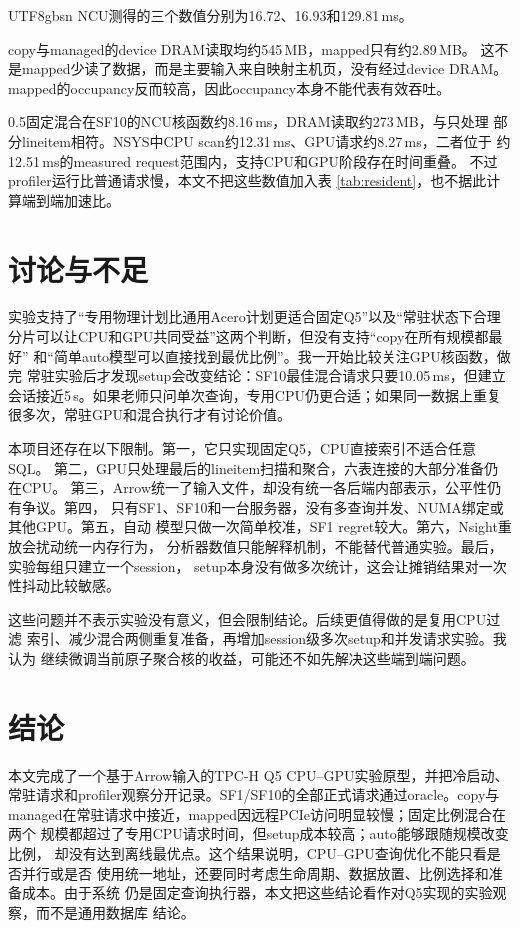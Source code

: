 \documentclass[10.5pt,compsoc]{CjC}
\begin{document}
\begin{CJK*}{UTF8}{gbsn}
NCU测得的三个数值分别为16.72、16.93和129.81\,ms。

copy与managed的device DRAM读取均约545\,MB，mapped只有约2.89\,MB。
这不是mapped少读了数据，而是主要输入来自映射主机页，没有经过device DRAM。
mapped的occupancy反而较高，因此occupancy本身不能代表有效吞吐。

0.5固定混合在SF10的NCU核函数约8.16\,ms，DRAM读取约273\,MB，与只处理
部分lineitem相符。NSYS中CPU scan约12.31\,ms、GPU请求约8.27\,ms，二者位于
约12.51\,ms的measured request范围内，支持CPU和GPU阶段存在时间重叠。
不过profiler运行比普通请求慢，本文不把这些数值加入表
\ref{tab:resident}，也不据此计算端到端加速比。

\section{讨论与不足}

实验支持了“专用物理计划比通用Acero计划更适合固定Q5”以及“常驻状态下合理
分片可以让CPU和GPU共同受益”这两个判断，但没有支持“copy在所有规模都最好”
和“简单auto模型可以直接找到最优比例”。我一开始比较关注GPU核函数，做完
常驻实验后才发现setup会改变结论：SF10最佳混合请求只要10.05\,ms，但建立
会话接近5\,s。如果老师只问单次查询，专用CPU仍更合适；如果同一数据上重复
很多次，常驻GPU和混合执行才有讨论价值。

本项目还存在以下限制。第一，它只实现固定Q5，CPU直接索引不适合任意SQL。
第二，GPU只处理最后的lineitem扫描和聚合，六表连接的大部分准备仍在CPU。
第三，Arrow统一了输入文件，却没有统一各后端内部表示，公平性仍有争议。第四，
只有SF1、SF10和一台服务器，没有多查询并发、NUMA绑定或其他GPU。第五，自动
模型只做一次简单校准，SF1 regret较大。第六，Nsight重放会扰动统一内存行为，
分析器数值只能解释机制，不能替代普通实验。最后，实验每组只建立一个session，
setup本身没有做多次统计，这会让摊销结果对一次性抖动比较敏感。

这些问题并不表示实验没有意义，但会限制结论。后续更值得做的是复用CPU过滤
索引、减少混合两侧重复准备，再增加session级多次setup和并发请求实验。我认为
继续微调当前原子聚合核的收益，可能还不如先解决这些端到端问题。

\section{结论}

本文完成了一个基于Arrow输入的TPC-H Q5 CPU--GPU实验原型，并把冷启动、
常驻请求和profiler观察分开记录。SF1/SF10的全部正式请求通过oracle。copy与
managed在常驻请求中接近，mapped因远程PCIe访问明显较慢；固定比例混合在两个
规模都超过了专用CPU请求时间，但setup成本较高；auto能够跟随规模改变比例，
却没有达到离线最优点。这个结果说明，CPU--GPU查询优化不能只看是否并行或是否
使用统一地址，还要同时考虑生命周期、数据放置、比例选择和准备成本。由于系统
仍是固定查询执行器，本文把这些结论看作对Q5实现的实验观察，而不是通用数据库
结论。


\end{CJK*}
\end{document}

